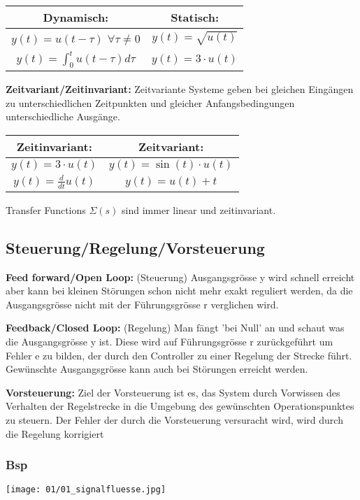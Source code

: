         \begin{center}
        \begin{tabular}{ c c }
            \textbf{Dynamisch:} & \textbf{Statisch:} \\ 
                \hline
                $ y(t) = u(t -\tau)$ 
                   $ \forall\tau \neq 0 $ & $y(t) = \sqrt{u(t)} $ \\ 
                \hline
                $y(t) = \int_0^{t} u(t-\tau)d\tau$ & $ y(t) = 3\cdot u(t) $
        \end{tabular}
        \end{center}
    \textbf{Zeitvariant/Zeitinvariant:} Zeitvariante Systeme geben bei gleichen            Eingängen zu unterschiedlichen Zeitpunkten und gleicher Anfangsbedingungen     unterschiedliche    
    Ausgänge.
         \begin{center}
            \begin{tabular}{ c c }
                \textbf{Zeitinvariant:} & \textbf{Zeitvariant:} \\ 
                    \hline
                    $ y(t) = 3 \cdot u(t)$ & $y(t) = \sin{\left(t\right)} \cdot u(t) $ \\ 
                    \hline
                    $y(t) = \frac{d}{dt}u(t)$ & $ y(t) = u(t) + t $
            \end{tabular}
        \end{center}
    Transfer Functions $\Sigma(s)$ sind immer linear und zeitinvariant.
    
    \subsection{Steuerung/Regelung/Vorsteuerung}
        \textbf{Feed forward/Open Loop:} (Steuerung) Ausgangsgrösse y wird schnell erreicht aber kann bei kleinen Störungen schon nicht mehr exakt reguliert werden, da die Ausgangsgrösse nicht mit der Führungsgrösse r verglichen wird.
        
        \textbf{Feedback/Closed Loop:} (Regelung) Man fängt 'bei Null' an und schaut was die Ausgangsgrösse y ist. Diese wird auf Führungsgrösse r zurückgeführt um Fehler e zu bilden, der durch den Controller zu einer Regelung der Strecke führt. Gewünschte Ausgangsgrösse kann auch bei Störungen erreicht werden.
        
        \textbf{Vorsteuerung:} Ziel der Vorsteuerung ist es, das System durch Vorwissen des Verhalten der Regelstrecke in die Umgebung des gewünschten Operationspunktes zu steuern. Der Fehler der durch die Vorsteuerung versuracht wird, wird durch die Regelung korrigiert
        
        \subsubsection{Bsp}
            \begin{center}
                \texttt{[image: 01/01\_signalfluesse.jpg]}
            \end{center}
